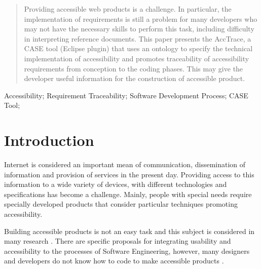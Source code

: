 \documentclass[10pt, conference, compsocconf]{IEEEtran}
\begin{document}
\begin{abstract}
Providing accessible web products is a challenge. In particular, the implementation of requirements is still 
a problem for many developers who may not have the necessary skills to perform this task, including difficulty 
in interpreting reference documents. This paper presents the AccTrace, a CASE tool (Eclipse plugin) that uses 
an ontology to specify the technical implementation of accessibility and promotes traceability of accessibility 
requirements from conception to the coding phases. This may give the developer useful information for the 
construction of accessible product.


\end{abstract}

\begin{IEEEkeywords}
Accessibility; Requirement Traceability; Software Development
Process; CASE Tool;

\end{IEEEkeywords}


%
\IEEEpeerreviewmaketitle



\section{Introduction}

Internet is considered an important mean of communication, dissemination of information and provision of services in the present day. Providing access to this information to a wide variety of devices, with different technologies and specifications has become a challenge. Mainly, people with special needs require  specially developed products that consider particular techniques promoting accessibility.

Building accessible products is not an easy task and this subject is considered in many research \cite{lazar:04,brajnik:06,zeng:05}. There are specific proposals for integrating usability and accessibility to the processes of Software Engineering, however, many designers and developers do not know how to code to make accessible products \cite{1630123,alves:11}.
\end{document}
